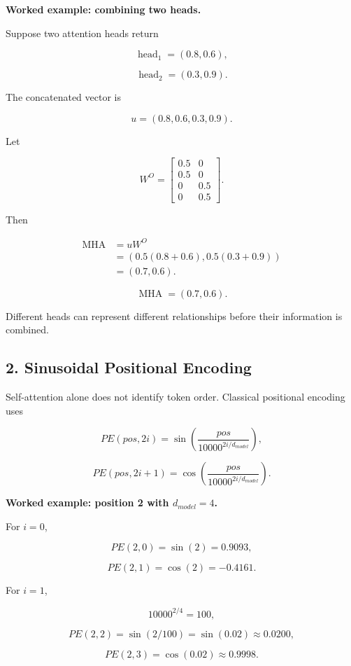 \documentclass[11pt,a4paper,twoside]{article}
\begin{document}
\textbf{Worked example: combining two heads.}

Suppose two attention heads return

\[
\operatorname{head}_1=(0.8,0.6),
\]

\[
\operatorname{head}_2=(0.3,0.9).
\]

The concatenated vector is

\[
u=(0.8,0.6,0.3,0.9).
\]

Let

\[
W^O=
\begin{bmatrix}
0.5&0\\
0.5&0\\
0&0.5\\
0&0.5
\end{bmatrix}.
\]

Then

\[
\begin{aligned}
\operatorname{MHA}
&=uW^O\\
&=\left(
0.5(0.8+0.6),
0.5(0.3+0.9)
\right)\\
&=(0.7,0.6).
\end{aligned}
\]

\[
\boxed{\operatorname{MHA}=(0.7,0.6).}
\]

Different heads can represent different relationships before their information is combined.

\subsection*{2. Sinusoidal Positional Encoding}

Self-attention alone does not identify token order. Classical positional encoding uses

\[
\boxed{
PE(pos,2i)=\sin\left(\frac{pos}{10000^{2i/d_{model}}}\right)
},
\]

\[
\boxed{
PE(pos,2i+1)=\cos\left(\frac{pos}{10000^{2i/d_{model}}}\right)
}.
\]

\textbf{Worked example: position 2 with $d_{model}=4$.}

For $i=0$,

\[
PE(2,0)=\sin(2)=0.9093,
\]

\[
PE(2,1)=\cos(2)=-0.4161.
\]

For $i=1$,

\[
10000^{2/4}=100,
\]

\[
PE(2,2)=\sin(2/100)=\sin(0.02)\approx0.0200,
\]

\[
PE(2,3)=\cos(0.02)\approx0.9998.
\]
\end{document}
